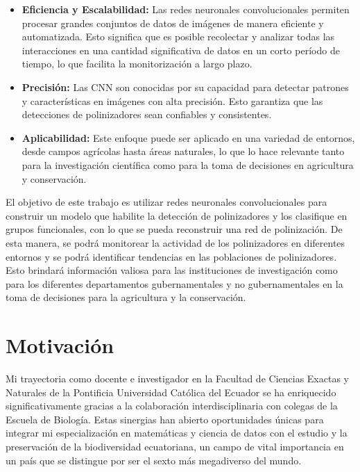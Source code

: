 \begin{itemize}
    \item 
    \textbf{Eficiencia y Escalabilidad:} Las redes neuronales convolucionales permiten procesar grandes conjuntos de datos de imágenes de manera eficiente y automatizada. Esto significa que es posible recolectar y analizar todas las interacciones en una cantidad significativa de datos en un corto período de tiempo, lo que facilita la monitorización a largo plazo.
    
    \item 
    \textbf{Precisión:} Las CNN son conocidas por su capacidad para detectar patrones y características en imágenes con alta precisión. Esto garantiza que las detecciones de polinizadores sean confiables y consistentes.
    
    \item 
    \textbf{Aplicabilidad:} Este enfoque puede ser aplicado en una variedad de entornos, desde campos agrícolas hasta áreas naturales, lo que lo hace relevante tanto para la investigación científica como para la toma de decisiones en agricultura y conservación.
\end{itemize}

El objetivo de este trabajo es utilizar redes neuronales convolucionales para construir un modelo que habilite la detección de polinizadores y los clasifique en grupos funcionales, con lo que se pueda reconstruir una red de polinización. De esta manera, se podrá monitorear la actividad de los polinizadores en diferentes entornos y se podrá identificar tendencias en las poblaciones de polinizadores. Esto brindará información valiosa para las instituciones de investigación como para los diferentes departamentos gubernamentales y no gubernamentales en la toma de decisiones para la agricultura y la conservación.



\section{Motivación}

Mi trayectoria como docente e investigador en la Facultad de Ciencias Exactas y Naturales de la Pontificia Universidad Católica del Ecuador se ha enriquecido significativamente gracias a la colaboración interdisciplinaria con colegas de la Escuela de Biología. Estas sinergias han abierto oportunidades únicas para integrar mi especialización en matemáticas y ciencia de datos con el estudio y la preservación de la biodiversidad ecuatoriana, un campo de vital importancia en un país que se distingue por ser el sexto más megadiverso del mundo.

